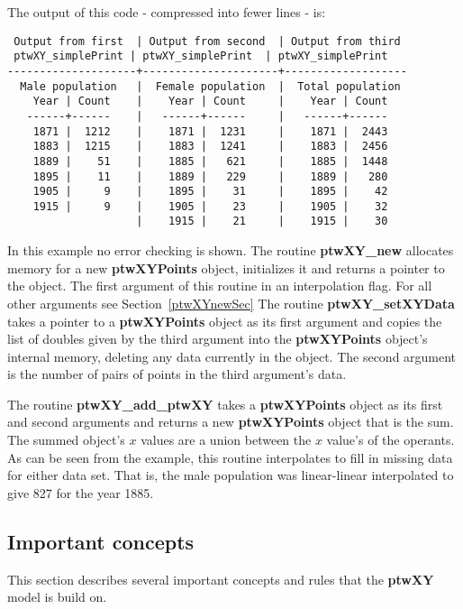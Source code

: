 \documentclass[11pt]{article}
\newcommand{\highlight}[1]{{\bf #1}}
\begin{document}
\noindent
The output of this code - compressed into fewer lines - is:

\begin{verbatim}
 Output from first  | Output from second  | Output from third
 ptwXY_simplePrint | ptwXY_simplePrint  | ptwXY_simplePrint
--------------------+---------------------+-------------------
  Male population   |  Female population  |  Total population
    Year | Count    |    Year | Count     |    Year | Count
   ------+------    |   ------+------     |   ------+------
    1871 |  1212    |    1871 |  1231     |    1871 |  2443
    1883 |  1215    |    1883 |  1241     |    1883 |  2456
    1889 |    51    |    1885 |   621     |    1885 |  1448
    1895 |    11    |    1889 |   229     |    1889 |   280
    1905 |     9    |    1895 |    31     |    1895 |    42
    1915 |     9    |    1905 |    23     |    1905 |    32
                    |    1915 |    21     |    1915 |    30
\end{verbatim}

\noindent
In this example no error checking is shown. The routine \highlight{ptwXY\_new} allocates memory for
a new \highlight{ptwXYPoints} object, initializes it and returns a pointer to the object. The first 
argument of this routine in an interpolation flag. For all other arguments see Section~\ref{ptwXYnewSec} The
routine \highlight{ptwXY\_setXYData} takes a pointer to a \highlight{ptwXYPoints} object as its first argument and copies 
the list of doubles given by the third argument into the \highlight{ptwXYPoints} object's internal memory, deleting
any data currently in the object. 
The second argument is the number of pairs of points
in the third argument's data. 

The routine \highlight{ptwXY\_add\_ptwXY} takes a \highlight{ptwXYPoints} object
as its first and second arguments and returns a new \highlight{ptwXYPoints} object that is the sum. 
The summed object's $x$ values are a union between the $x$ value's of the operants.  As can be seen
from the example, this routine interpolates to fill in missing data for either data set. That is, the male population
was linear-linear interpolated to give 827 for the year 1885.

\subsection{Important concepts}
This section describes several important concepts and rules that the \highlight{ptwXY} model is build on.
\end{document}

